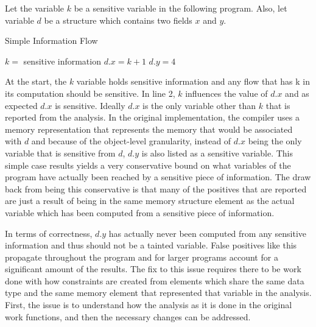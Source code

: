 \documentclass[11pt,a4paper]{article}
\begin{document}
  Let the variable $k$ be a sensitive variable in the following program. Also, let
  variable $d$ be a structure which contains two fields $x$ and $y$.

  \begin{algorithm}
    \caption{Simple Information Flow}
  \begin{algorithmic}
    \State $k =$ sensitive information
    \State $d.x =  k + 1$
    \State $d.y = 4$
  \end{algorithmic}
  \end{algorithm}

  \begin{algorithm}

  \end{algorithm}

  At the start, the $k$ variable holds sensitive information and any flow that has k
  in its computation should be sensitive. In line 2, $k$ influences the value of $d.x$
  and as expected $d.x$ is sensitive. Ideally $d.x$ is the only variable other
  than $k$ that is reported from the analysis. In the original implementation,
  the compiler uses a memory representation that represents the memory that would
  be associated with $d$ and because of the object-level granularity, instead of
  $d.x$ being the only variable that is sensitive from $d$, $d.y$ is also listed
  as a sensitive variable. This simple case results yields a very conservative
  bound on what variables of the program have actually been reached by a sensitive
  piece of information. The draw back from being this conservative is that many of
  the positives that are reported are just a result of being in the same memory
  structure element as the actual variable which has been computed from a
  sensitive piece of information.


  In terms of correctness, $d.y$ has actually never been computed from any
  sensitive information and thus should not be a tainted variable. False
  positives like this propagate throughout the program and for larger programs
  account for a significant amount of the results. The fix to this issue
  requires there to be work done with how constraints are created from elements
  which share the same data type and the same memory element that represented
  that variable in the analysis. First, the issue is to understand how the
  analysis as it is done in the original work functions, and then the necessary
  changes can be addressed.
\end{document}
